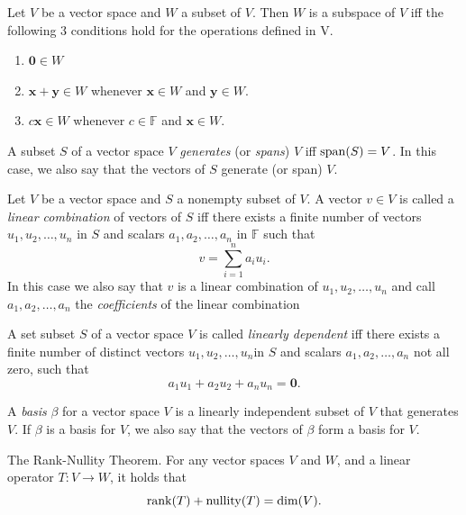 \documentclass[../Notes.tex]{subfiles}
\begin{document}
\begin{theorem}{}{}
    Let \(V\) be a vector space and \(W\) a subset of \(V\). Then \(W\) is a subspace of \(V\) iff the following 3 conditions hold for the operations defined in V.
            \begin{enumerate}[label=(\alph*)]
                \item \(\mathbf{0} \in W\) \label{Theorem 1.3(a)}
                \item \(\mathbf{x}+\mathbf{y} \in W\) whenever \(\mathbf{x} \in W\) and \(\mathbf{y} \in W\). \label{Theorem 1.3(b)}
                \item \(c\mathbf{x} \in W\) whenever \(c \in \mathbb{F}\) and \(\mathbf{x} \in W\). \label{Theorem 1.3(c)}
            \end{enumerate}
\end{theorem}
\begin{definition}{}{}
    A subset \(S\) of a vector space \(V\) \emph{generates} (or \emph{spans}) \(V\) iff \(\operatorname{span}(S)=V\). In this case, we also say that the vectors of \(S\) generate (or span) \(V\).
\end{definition}
\begin{definition}{}{}
    Let \(V\) be a vector space and \(S\) a nonempty subset of \(V\). A vector \(v \in V\) is called a \emph{linear combination} of vectors of \(S\) iff there exists a finite number of vectors \(u_1,u_2,\dots,u_n\) in \(S\) and scalars \(a_1,a_2,\dots,a_n\) in \(\mathbb{F}\) such that
            \[v=\sum_{i=1}^{n}{a_iu_i}.\]
            In this case we also say that \(v\) is a linear combination of \(u_1,u_2,\dots,u_n\) and call \(a_1,a_2,\dots,a_n\) the \emph{coefficients} of the linear combination
\end{definition}
\begin{definition}{}{}
    A set subset \(S\) of a vector space \(V\) is called \emph{linearly dependent} iff there exists a finite number of distinct vectors \(u_1,u_2,\dots,u_n\)in \(S\) and scalars \(a_1,a_2,\dots,a_n\) not all zero, such that
            \[a_1u_1+a_2u_2+a_nu_n=\mathbf{0}.\]
\end{definition}
\begin{definition}{}{}
    A \emph{basis} \(\beta\) for a vector space \(V\) is a linearly independent subset of \(V\) that generates \(V\). If \(\beta\) is a basis for \(V\), we also say that the vectors of \(\beta\) form a basis for \(V\).
\end{definition}
\begin{theorem}{The Rank-Nullity Theorem.}{}
    For any vector spaces \(V\) and \(W\), and a linear operator \(T \colon V \to W\), it holds that
    \[\operatorname{rank}(T)+\operatorname{nullity}(T)=\dim(V).\]
\end{theorem}
\end{document}
